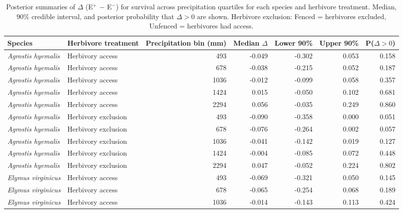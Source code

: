 \documentclass[12pt]{article}\usepackage[]{graphicx}\usepackage[dvipsnames]{xcolor}
\begin{document}
{\begin{landscape}
\begin{table}[ht]
\centering
\small
\caption[Summaries of $\Delta$ (E$^{+}$ $-$ E$^{-}$) for survival across precipitation bins]{
Posterior summaries of $\Delta$ (E$^{+}$ $-$ E$^{-}$) for survival across precipitation quartiles for each species and herbivore treatment. 
Median, 90\% credible interval, and posterior probability that $\Delta > 0$ are shown. 
Herbivore exclusion: Fenced = herbivores excluded, Unfenced = herbivores had access.
}
\label{tab:delta_summary_surv_quantiles}
\begin{tabular}{llrrrrr}
\hline
\textbf{Species} & \textbf{Herbivore treatment} & \textbf{Precipitation bin (mm)} & \textbf{Median $\Delta$} & \textbf{Lower 90\%} & \textbf{Upper 90\%} & \textbf{P($\Delta>0$)} \\
\hline
\textit{Agrostis hyemalis} & Herbivory access    & 493  & -0.049 & -0.302 & 0.053 & 0.158 \\
\textit{Agrostis hyemalis} & Herbivory access    & 678  & -0.038 & -0.215 & 0.052 & 0.187 \\
\textit{Agrostis hyemalis} & Herbivory access    & 1036 & -0.012 & -0.099 & 0.058 & 0.357 \\
\textit{Agrostis hyemalis} & Herbivory access    & 1424 & 0.015  & -0.050 & 0.102 & 0.681 \\
\textit{Agrostis hyemalis} & Herbivory access    & 2294 & 0.056  & -0.035 & 0.249 & 0.860 \\
\textit{Agrostis hyemalis} & Herbivory exclusion & 493  & -0.090 & -0.358 & 0.000 & 0.051 \\
\textit{Agrostis hyemalis} & Herbivory exclusion & 678  & -0.076 & -0.264 & 0.002 & 0.057 \\
\textit{Agrostis hyemalis} & Herbivory exclusion & 1036 & -0.041 & -0.142 & 0.019 & 0.127 \\
\textit{Agrostis hyemalis} & Herbivory exclusion & 1424 & -0.004 & -0.085 & 0.072 & 0.448 \\
\textit{Agrostis hyemalis} & Herbivory exclusion & 2294 & 0.047  & -0.052 & 0.224 & 0.802 \\
\textit{Elymus virginicus} & Herbivory access    & 493  & -0.069 & -0.321 & 0.050 & 0.145 \\
\textit{Elymus virginicus} & Herbivory access    & 678  & -0.065 & -0.254 & 0.068 & 0.189 \\
\textit{Elymus virginicus} & Herbivory access    & 1036 & -0.014 & -0.143 & 0.113 & 0.424 \\

\end{tabular}
\end{table}
\end{landscape}}
\end{document}
